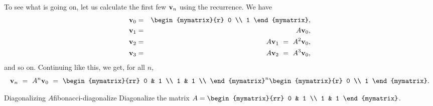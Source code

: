 \begin{solution}
  To see what is going on, let us calculate the first few
  $\mbox{\bf v}_n$ using the recurrence. We have
  \begin{eqnarray*}
    \vect{v}_0 &=& \begin{mymatrix}{r} 0 \\ 1 \end{mymatrix}, \\
    \vect{v}_1 &=& A\vect{v}_0, \\
    \vect{v}_2 &=& A\vect{v}_1 ~=~ A^2\vect{v}_0, \\
    \vect{v}_3 &=& A\vect{v}_2 ~=~ A^3\vect{v}_0, \\
  \end{eqnarray*}
  and so on. Continuing like this, we get, for all $n$,
  \begin{equation*}
    \vect{v}_n
    ~=~ A^n\vect{v}_0
    ~=~ \begin{mymatrix}{rr}
      0 & 1 \\
      1 & 1 \\
    \end{mymatrix}^n
    \begin{mymatrix}{r} 0 \\ 1 \end{mymatrix}.
  \end{equation*}
\end{solution}

\begin{example}{Diagonalizing $A$}{fibonacci-diagonalize}
  Diagonalize the matrix
  $A=\begin{mymatrix}{rr} 0 & 1 \\ 1 & 1 \end{mymatrix}$.
\end{example}

